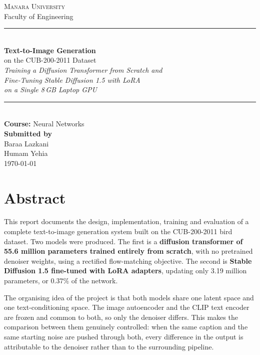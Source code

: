 \documentclass[11pt,a4paper]{article}
\begin{document}
\begin{titlepage}
\centering
\vspace*{1.6cm}

{\Large\scshape Manara University}\\[0.3cm]
{\large Faculty of Engineering}\\[1.6cm]

\textcolor{accent}{\rule{\textwidth}{2pt}}\\[0.7cm]
{\Huge\bfseries Text-to-Image Generation}\\[0.45cm]
{\LARGE on the CUB-200-2011 Dataset}\\[0.8cm]
{\large\itshape Training a Diffusion Transformer from Scratch and\\
Fine-Tuning Stable Diffusion 1.5 with LoRA\\
on a Single 8\,GB Laptop GPU}\\[0.6cm]
\textcolor{accent}{\rule{\textwidth}{2pt}}\\[1.8cm]

{\large\bfseries Course:} {\large Neural Networks}\\[1.6cm]

{\large\bfseries Submitted by}\\[0.5cm]
{\Large Baraa Lazkani}\\[0.35cm]
{\Large Humam Yehia}\\[2.4cm]

{\large \today}

\vfill
\end{titlepage}

\section*{Abstract}

This report documents the design, implementation, training and evaluation of a
complete text-to-image generation system built on the CUB-200-2011 bird dataset.
Two models were produced. The first is a \textbf{diffusion transformer of 55.6
million parameters trained entirely from scratch}, with no pretrained denoiser
weights, using a rectified flow-matching objective. The second is
\textbf{Stable Diffusion 1.5 fine-tuned with LoRA adapters}, updating only 3.19
million parameters, or $0.37\%$ of the network.

The organising idea of the project is that both models share one latent space
and one text-conditioning space. The image autoencoder and the CLIP text encoder
are frozen and common to both, so only the denoiser differs. This makes the
comparison between them genuinely controlled: when the same caption and the same
starting noise are pushed through both, every difference in the output is
attributable to the denoiser rather than to the surrounding pipeline.
\end{document}

